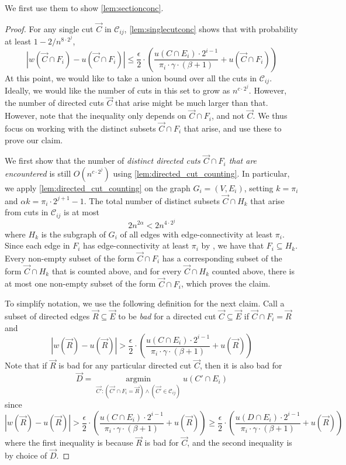 \documentclass[11pt,a4paper]{article}
\newcommand{\argmin}{\operatorname*{argmin}}
\newcommand{\abs}[1]{\ensuremath{\left| #1 \right|}}
\newcommand{\eps}{\epsilon}
\newcommand{\bound}{\abs{w(\vec{C} \cap F_i) - u(\vec{C} \cap F_i)} \le \frac{\eps}{2} \cdot \left( \frac{u(C \cap E_i) \cdot 2^{i-1}}{\pi_i \cdot \gamma \cdot (\beta+1)} + u(\vec{C} \cap F_i) \right)}
\begin{document}
We first use them to show \cref{lem:sectionconc}.

\sectionconc*

\begin{proof}
For any single cut $\vec{C}$ in $\mathcal C_{ij}$, \cref{lem:singlecutconc} shows that with probability at least $1 - 2/n^{8\cdot 2^j}$,
\[
\bound
\]
At this point, we would like to take a union bound over all the cuts in $\mathcal C_{ij}$. Ideally, we would like the number of cuts in this set to grow as $n^{c \cdot 2^j}$.
However, the number of directed cuts $\vec{C}$ that arise might be much larger than that. However, note that the inequality only depends on $\vec{C} \cap F_i$, and not $\vec{C}$. We thus focus on working with the distinct subsets $\vec{C} \cap F_i$ that arise, and use these to prove our claim.

We first show that the number of \emph{distinct directed cuts $\vec{C} \cap F_i$ that are encountered} is still $O(n^{c \cdot 2^j})$ using \cref{lem:directed_cut_counting}. In particular, we apply \cref{lem:directed_cut_counting} on the graph $G_i = (V, E_i)$, setting $k = \pi_i$ and $\alpha k = \pi_i \cdot 2^{j+1} - 1$.
The total number of distinct subsets $\vec{C} \cap H_k$ that arise from cuts in $\mathcal C_{ij}$ is at most
\[
2 n^{2 \alpha} < 2 n^{4 \cdot 2^j}
\]
where $H_k$ is the subgraph of $G_i$ of all edges with edge-connectivity at least $\pi_i$.
Since each edge in $F_i$ has edge-connectivity at least $\pi_i$ by \piconnectivity, we have that $F_i \subseteq H_k$. Every non-empty subset of the form $\vec{C} \cap F_i$ has a corresponding subset of the form $\vec{C} \cap H_k$ that is counted above, and for every $\vec{C} \cap H_k$ counted above, there is at most one non-empty subset of the form $\vec{C} \cap F_i$, which proves the claim.

To simplify notation, we use the following definition for the next claim.
Call a subset of directed edges $\vec{R} \subseteq \vec{E}$ to be \emph{bad} for a directed cut $\vec{C} \subseteq \vec{E}$ if $\vec{C} \cap F_i = \vec{R}$ and
\[
\abs{w(\vec{R}) - u(\vec{R})} > \frac{\eps}{2} \cdot \left( \frac{u(C \cap E_i) \cdot 2^{i-1}}{\pi_i \cdot \gamma \cdot (\beta+1)} + u(\vec{R}) \right)
\]
Note that if $\vec{R}$ is bad for any particular directed cut $\vec{C}$, then it is also bad for
\[
\vec{D} = \argmin_{\vec{C'}: (\vec{C'} \cap F_i = \vec{R}) \land (\vec{C'} \in \mathcal C_{ij})} u(C' \cap E_i)
\]
since
\[
\abs{w(\vec{R}) - u(\vec{R})}
> \frac{\eps}{2} \cdot \left( \frac{u(C \cap E_i) \cdot 2^{i-1}}{\pi_i \cdot \gamma \cdot (\beta+1)} + u(\vec{R}) \right)
\ge \frac{\eps}{2} \cdot \left( \frac{u(D \cap E_i) \cdot 2^{i-1}}{\pi_i \cdot \gamma \cdot (\beta+1)} + u(\vec{R}) \right)
\]
where the first inequality is because $\vec{R}$ is bad for $\vec{C}$, and the second inequality is by choice of $\vec{D}$.


\end{proof}
\end{document}
